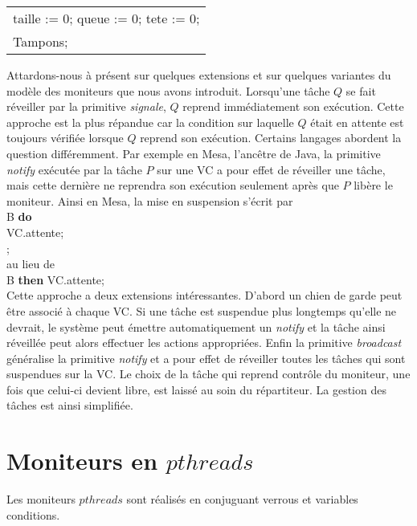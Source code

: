 \begin{algorithm}[!ht]
\begin{center}
\begin{tabular}{l}
\hspace{0.3cm}{\bf begin} taille := 0; queue := 0; tete := 0; \\
\hspace{0.3cm}{\bf end} Tampons;
\end{tabular}
\end{center}
\end{algorithm}
\par
Attardons-nous à présent sur quelques extensions et sur quelques variantes du modèle des moniteurs que nous avons introduit. Lorsqu'une tâche $Q$ se fait réveiller par la primitive {\em signale}, $Q$ reprend immédiatement son exécution. Cette approche est la plus répandue car la condition sur laquelle $Q$ était en attente est toujours vérifiée lorsque $Q$ reprend son exécution. Certains langages abordent la question différemment.  Par exemple en Mesa, l'ancêtre de Java, la primitive {\em notify} exécutée par la tâche $P$ sur une VC a pour effet de réveiller une tâche, mais cette dernière ne reprendra son exécution seulement après que $P$ libère le moniteur. Ainsi en Mesa, la mise en suspension s'écrit par  \\
\hspace*{1cm}{\bf while} B {\bf do}  \\
\hspace*{1.3cm}VC.attente;  \\
\hspace*{1cm}{\bf end};  \\
au lieu de  \\
\hspace*{1cm}{\bf if} B {\bf then}  VC.attente; \\
Cette approche a deux extensions intéressantes. D'abord un chien de garde peut être associé à chaque VC. Si une tâche est suspendue plus longtemps qu'elle ne devrait, le système peut émettre automatiquement un {\em notify} et la tâche ainsi réveillée peut alors effectuer les actions appropriées. Enfin la primitive {\em broadcast} généralise la primitive {\em notify} et a pour effet de réveiller toutes les tâches qui sont suspendues sur la VC. Le choix de la tâche qui reprend contrôle du moniteur, une fois que celui-ci devient libre, est laissé au soin du répartiteur. La gestion des tâches est ainsi simplifiée.

\section{Moniteurs en $pthreads$}
Les moniteurs $pthreads$ sont réalisés en conjuguant verrous et variables conditions.
